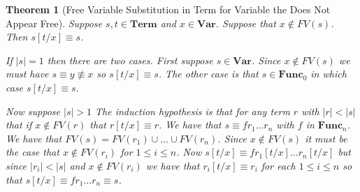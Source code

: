 \documentclass[12pt]{article}
\theoremstyle{break}
\theoremstyle{break}
\newtheorem{theorem}{Theorem}[section]
\theoremstyle{break}
\theoremstyle{break}
\theoremstyle{break}
\newtheorem{informal definition}[definition]{Informal Definition}
\begin{document}
\begin{theorem}[Free Variable Substitution in Term for Variable the Does Not Appear Free]
\label{thm:fvsubtermvarnotappear}
Suppose $s, t \in \textbf{Term}$ and $x \in \textbf{Var}$. Suppose that $x\not \in FV(s)$. Then $s[t/x] \equiv s$.

If $|s| = 1$ then there are two cases. First suppose $s\in \textbf{Var}$. Since $x\not \in FV(s)$ we must have $s \equiv y \not \equiv x$ so $s[t/x] \equiv s$. The other case is that $s\in \textbf{Func}_0$ in which case $s[t/x]\equiv s$.

Now suppose $|s|>1$ The induction hypothesis is that for any term $r$ with $|r| < |s|$ that if $x \not \in FV(r)$ that $r[t/x] \equiv r$. We have that $s \equiv fr_1\ldots r_n$ with $f$ in $\textbf{Func}_n$. We have that $FV(s) = FV(r_1)\cup\ldots\cup FV(r_n)$. Since $x\not \in FV(s)$ it must be the case that $x \not \in FV(r_i)$ for $1\le i \le n$. Now $s[t/x] \equiv fr_1[t/x]\ldots r_n[t/x]$ but since $|r_i|<|s|$ and $x\not \in FV(r_i)$ we have that $r_i[t/x] \equiv r_i$ for each $1\le i \le n$ so that $s[t/x] \equiv fr_1\ldots r_n \equiv s$.
\end{theorem}
\end{document}

